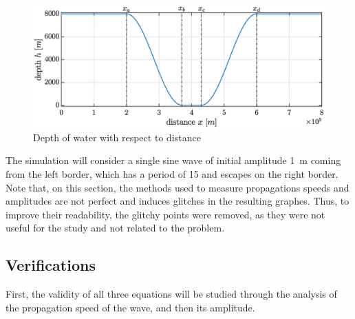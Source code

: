 \documentclass[a4paper,12pt,twoside]{article}
\begin{document}
      \begin{figure}[h]
        \centering
        \includegraphics[width=\textwidth]{graphs/tsunami_depth.eps}
        \caption{Depth of water with respect to distance}
        \label{fig:tsunami-depth}
      \end{figure}

      The simulation will consider a single sine wave of initial amplitude \SI{1}{\meter} coming from the left border, which has a period of \SI{15}{\min} and escapes on the right border.\\

      Note that, on this section, the methods used to measure propagations speeds and amplitudes are not perfect and induces glitches in the resulting graphes.
      Thus, to improve their readability, the glitchy points were removed, as they were not useful for the study and not related to the problem.\\

      \subsection{Verifications} %
      First, the validity of all three equations will be studied through the analysis of the propagation speed of the wave, and then its amplitude.
\end{document}
